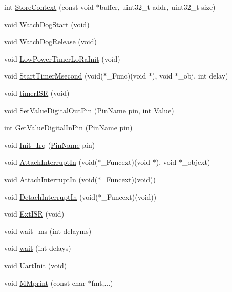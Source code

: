 \begin{DoxyCompactItemize}
\item 
int \mbox{\hyperlink{class_mcu_s_t_m32_l0_a1e6b6bb844e97540569e470b02521e73}{Store\+Context}} (const void $\ast$buffer, uint32\+\_\+t addr, uint32\+\_\+t size)
\item 
void \mbox{\hyperlink{class_mcu_s_t_m32_l0_aa27cfb60d6a8de8e0dca577301593702}{Watch\+Dog\+Start}} (void)
\item 
void \mbox{\hyperlink{class_mcu_s_t_m32_l0_ac4ba79bb4ea368ee3be5caa28a627db3}{Watch\+Dog\+Release}} (void)
\item 
void \mbox{\hyperlink{class_mcu_s_t_m32_l0_a69b962b22e3c2c0715334cbab25ae5ad}{Low\+Power\+Timer\+Lo\+Ra\+Init}} (void)
\item 
void \mbox{\hyperlink{class_mcu_s_t_m32_l0_a030cf30bd18def0e23b96163bcb8f47d}{Start\+Timer\+Msecond}} (void($\ast$\+\_\+\+Func)(void $\ast$), void $\ast$\+\_\+obj, int delay)
\item 
void \mbox{\hyperlink{class_mcu_s_t_m32_l0_a83ab01e1afdadbf02622e0ec006b2101}{timer\+I\+SR}} (void)
\item 
void \mbox{\hyperlink{class_mcu_s_t_m32_l0_a3c06e74b5182d28f26ddb3fec6d9234d}{Set\+Value\+Digital\+Out\+Pin}} (\mbox{\hyperlink{_class_s_t_m32_l0_8h_a5ceb873075d76667eb54dc6a7d2734d1}{Pin\+Name}} pin, int Value)
\item 
int \mbox{\hyperlink{class_mcu_s_t_m32_l0_ae390ee944052cf1d32fd5fb763921db8}{Get\+Value\+Digital\+In\+Pin}} (\mbox{\hyperlink{_class_s_t_m32_l0_8h_a5ceb873075d76667eb54dc6a7d2734d1}{Pin\+Name}} pin)
\item 
void \mbox{\hyperlink{class_mcu_s_t_m32_l0_a950256ebfaebe49d311b95167ec00998}{Init\+\_\+\+Irq}} (\mbox{\hyperlink{_class_s_t_m32_l0_8h_a5ceb873075d76667eb54dc6a7d2734d1}{Pin\+Name}} pin)
\item 
void \mbox{\hyperlink{class_mcu_s_t_m32_l0_a981d2d9d62185d36077d9383a4870eba}{Attach\+Interrupt\+In}} (void($\ast$\+\_\+\+Funcext)(void $\ast$), void $\ast$\+\_\+objext)
\item 
void \mbox{\hyperlink{class_mcu_s_t_m32_l0_a3c835a5b4bc7eaaaa13ab4822cd5d67a}{Attach\+Interrupt\+In}} (void($\ast$\+\_\+\+Funcext)(void))
\item 
void \mbox{\hyperlink{class_mcu_s_t_m32_l0_a0611ce0bfba12f6da5c8753c12ceda65}{Detach\+Interrupt\+In}} (void($\ast$\+\_\+\+Funcext)(void))
\item 
void \mbox{\hyperlink{class_mcu_s_t_m32_l0_a20414b108d17059f551e3fd928733a15}{Ext\+I\+SR}} (void)
\item 
void \mbox{\hyperlink{class_mcu_s_t_m32_l0_aa5c59fb3cc40e456c8ca2dfb573d2db5}{wait\+\_\+ms}} (int delayms)
\item 
void \mbox{\hyperlink{class_mcu_s_t_m32_l0_a2f73d46dfb58e1145838988645e20045}{wait}} (int delays)
\item 
void \mbox{\hyperlink{class_mcu_s_t_m32_l0_a9b7a19473391bfd637658520b7240173}{Uart\+Init}} (void)
\item 
void \mbox{\hyperlink{class_mcu_s_t_m32_l0_a23c56a6c3f82d731a344793288b2c998}{M\+Mprint}} (const char $\ast$fmt,...)
\end{DoxyCompactItemize}
